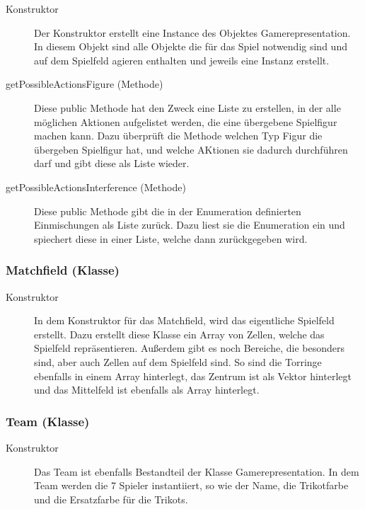 		\begin{description}
                
			\item[Konstruktor]
			Der Konstruktor erstellt eine Instance des Objektes Gamerepresentation. In diesem Objekt sind alle Objekte die für das Spiel notwendig sind und auf dem Spielfeld agieren enthalten und jeweils eine Instanz erstellt.
                
        	\item[getPossibleActionsFigure (Methode)]
        	Diese public Methode hat den Zweck eine Liste zu erstellen, in der alle möglichen Aktionen aufgelistet werden, die eine übergebene Spielfigur machen kann. Dazu überprüft die Methode welchen Typ Figur die übergeben Spielfigur hat, und welche AKtionen sie dadurch durchführen darf und gibt diese als Liste wieder.
        	
        	\item[getPossibleActionsInterference (Methode)]
        	Diese public Methode gibt die in der Enumeration definierten Einmischungen als Liste zurück. Dazu liest sie die Enumeration ein und spiechert diese in einer Liste, welche dann zurückgegeben wird. 
        \end{description}
        	
        \subsubsection{Matchfield (Klasse)}
        \begin{description}
        	\item[Konstruktor]
        	In dem Konstruktor für das Matchfield, wird das eigentliche Spielfeld erstellt. Dazu erstellt diese Klasse ein Array von Zellen, welche das Spielfeld repräsentieren. Außerdem gibt es noch Bereiche, die besonders sind, aber auch Zellen auf dem Spielfeld sind. So sind die Torringe ebenfalls in einem Array hinterlegt, das Zentrum ist als Vektor hinterlegt und das Mittelfeld ist ebenfalls als Array hinterlegt.
        \end{description}
        
        \subsubsection{Team (Klasse)}
        \begin{description}
        	\item[Konstruktor]
        	Das Team ist ebenfalls Bestandteil der Klasse Gamerepresentation. In dem Team werden die 7 Spieler instantiiert, so wie der Name, die Trikotfarbe und die Ersatzfarbe für die Trikots.
        \end{description}
        

